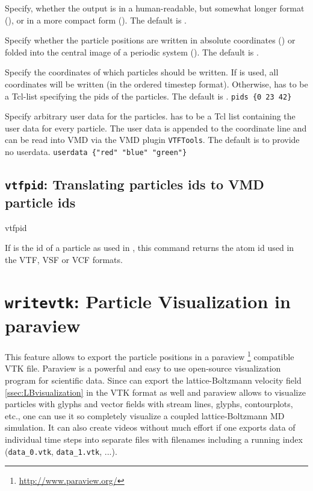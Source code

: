 \begin{arguments}
\item[\opt{\alt{short \asep verbose}}] Specify, whether the output is
  in a human-readable, but somewhat longer format (),
  or in a more compact form (). The default is
  .
  
\item[\opt{\alt{folded \asep absolute}}] Specify whether the particle
  positions are written in absolute coordinates ()
  or folded into the central image of a periodic system
  (). The default is .
  
\item[\opt{pids \alt{\var{pids} \asep all}}] Specify the coordinates
  of which particles should be written. If  is used, all
  coordinates will be written (in the ordered timestep format).
  Otherwise,  has to be a Tcl-list specifying the pids of
  the particles. The default is .
   \verb!pids {0 23 42}!

\item[\opt{userdata \var{userdata}}] Specify arbitrary user data for
  the particles.  has to be a Tcl list containing the
  user data for every particle. The user data is appended to the
  coordinate line and can be read into VMD via the VMD plugin
  \texttt{VTFTools}. The default is to provide no userdata.
   \verb!userdata {"red" "blue" "green"}!
\end{arguments}


\subsection{\texttt{vtfpid}: Translating \es particles ids to VMD
  particle ids}
\begin{essyntax}
  vtfpid 
\end{essyntax}
If  is the id of a particle as used in \es, this command
returns the atom id used in the VTF, VSF or VCF formats.

\section{\texttt{writevtk}: Particle Visualization in paraview}
\label{sec:writevtk}

This feature allows to export the particle positions in a paraview
\footnote{\url{http://www.paraview.org/}} compatible VTK
file. Paraview is a powerful and easy to use open-source visualization
program for scientific data. Since \es can export the
lattice-Boltzmann velocity field \ref{ssec:LBvisualization} in the VTK
format as well and paraview allows to visualize particles with glyphs
and vector fields with stream lines, glyphs, contourplots, etc., one
can use it so completely visualize a coupled lattice-Boltzmann MD
simulation. It can also create videos without much effort if one
exports data of individual time steps into separate files with
filenames including a running index (\texttt{data_0.vtk},
\texttt{data_1.vtk}, ...).

